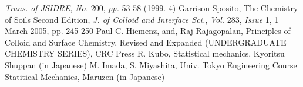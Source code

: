 \documentclass{article}
\begin{document}
\begin{thebibliography}{99}
   \textit{Trans. of JSIDRE}, \textit{No.} 200, \textit{pp.} 53-58 (1999. 4)
  Garrison Sposito, The Chemistry of Soils Second Edition, 
  \textit{J. of Colloid and Interface Sci.}, \textit{Vol.} 283, \textit{Issue} 1, 1 March 2005, pp. 245-250
  Paul C. Hiemenz, and, Raj Rajagopalan, Principles of Colloid and Surface Chemistry, Revised and Expanded (UNDERGRADUATE CHEMISTRY SERIES), CRC Press
     R. Kubo, Statistical mechanics, Kyoritsu Shuppan (in Japanese)
  M. Imada, S. Miyashita, Univ. Tokyo Engineering Course Statitical Mechanics, Maruzen (in Japanese)
\end{thebibliography}
\end{document}
